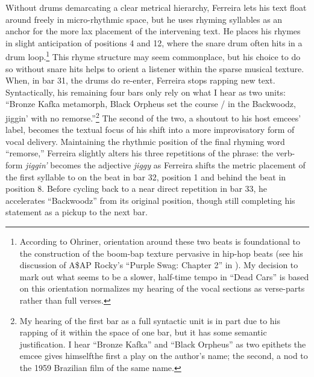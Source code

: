 Without drums demarcating a clear metrical hierarchy, Ferreira lets his text float around freely in 
micro-rhythmic space, but he uses rhyming syllables as an anchor for the more lax placement of the 
intervening text. He places his rhymes in slight anticipation of positions 4 and 12, where the snare
drum often hits in a drum loop.\footnote{
    According to Ohriner, orientation around these two beats is foundational to the 
    construction of the boom-bap texture pervasive in hip-hop beats (see his discussion
    of A\$AP Rocky's ``Purple Swag:  Chapter 2'' in 
    \autocite[18]{mitchellohrinerFlowRhythmicVoice2019}). My decision to mark out what 
    seems to be a slower, half-time tempo in ``Dead Cars'' is based on this orientation
    normalizes my hearing of the vocal sections as verse-parts rather than full verses.}
This rhyme structure may seem commonplace, but his choice to do so without snare hits helps to orient
a listener within the sparse musical texture. When, in bar 31, the drums do re-enter, Ferreira stops
rapping new text. Syntactically, his remaining four bars only rely on what I hear as two units: ``Bronze
Kafka metamorph, Black Orpheus set the course / in the Backwoodz, jiggin' with no remorse.''\footnote{
    My hearing of the first bar as a full syntactic unit is in part due to his rapping 
    of it within the space of one bar, but it has some semantic justification. I hear
    ``Bronze Kafka'' and ``Black Orpheus'' as two epithets the emcee gives 
    himself\textemdash the first a play on the author's name; the second, a nod to the
    1959 Brazilian film of the same name.}
The second of the two, a shoutout to his host emcees' label, becomes the textual focus of his shift into
a more improvisatory form of vocal delivery. Maintaining the rhythmic position of the final rhyming word
``remorse,'' Ferreira slightly alters his three repetitions of the phrase: the verb-form \textit{jiggin'}
becomes the adjective \textit{jiggy} as Ferreira shifts the metric placement of the first syllable to on
the beat in bar 32, position 1 and behind the beat in position 8. Before cycling back to a near direct 
repetition in bar 33, he accelerates ``Backwoodz'' from its original position, though still completing his
statement as a pickup to the next bar.

